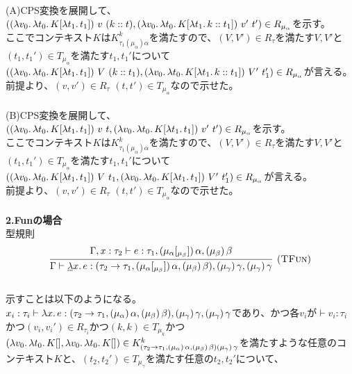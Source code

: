 \\
(A)CPS変換を展開して、\\
$(\LamP{v_0}{\Lam{t_0}{K[\Lam{t_1}{t_1}]}}\ v\ \ConsP{k}{t}, \LamP{v_0}{\Lam{t_0}{K[\Lam{t_1}{\Cons{k}{t_1}}]}}\ v'\ t')\in R_{\mu_{\alpha}}$を示す。\\
ここでコンテキスト$K$は$K^k_{\tau_1(\mu_{\alpha})\alpha}$を満たすので、$(V,V')\in R_{\tau}$を満たす$V,V'$と$(t_1, t_1')\in T_{\mu_{\alpha}}$を満たす$t_1, t_1'$について\\
$(\LamP{v_0}{\Lam{t_0}{K[\Lam{t_1}{t_1}]}}\ V\ \ConsP{k}{t_1}, \LamP{v_0}{\Lam{t_0}{K[\Lam{t_1}{\Cons{k}{t_1}}]}}\ V'\ t_1')\in R_{\mu_{\alpha}}$が言える。\\
前提より、$(v,v')\in R_{\tau}$ $(t, t') \in T_{\mu_{\alpha}}$なので示せた。\\
\\
(B)CPS変換を展開して、\\
$(\LamP{v_0}{\Lam{t_0}{K[\Lam{t_1}{t_1}]}}\ v\ t, \LamP{v_0}{\Lam{t_0}{K[\Lam{t_1}{t_1}]}}\ v'\ t')\in R_{\mu_{\alpha}}$を示す。\\
ここでコンテキスト$K$は$K^k_{\tau_1(\mu_{\alpha})\alpha}$を満たすので、$(V,V')\in R_{\tau}$を満たす$V,V'$と$(t_1, t_1')\in T_{\mu_{\alpha}}$を満たす$t_1, t_1'$について\\
$(\LamP{v_0}{\Lam{t_0}{K[\Lam{t_1}{t_1}]}}\ V\ t_1, \LamP{v_0}{\Lam{t_0}{K[\Lam{t_1}{t_1}]}}\ V'\ t_1')\in R_{\mu_{\alpha}}$が言える。\\
前提より、$(v,v')\in R_{\tau}$ $(t, t') \in T_{\mu_{\alpha}}$なので示せた。\\
\\
\textbf{2.Funの場合}\\
型規則
\[
\begin{array}{c}
\infer[\TFun]
      {\JudgeTrail{\Gamma}{\DLam{x}{e}}
                  {\ArrowTrailP{\tau_2}{\tau_1}
                               {\TrailsType{\alpha}{\beta}}
                               {\TrailType{\beta}}}
                  {\TrailType{\gamma}}
                  {\TrailType{\gamma}}}
      {\JudgeTrail{\Gamma,x:\tau_2}{e}{\tau_1}
                  {\TrailsType{\alpha}{\beta}}
                  {\TrailType{\beta}}}
\end{array}
\]
\\
示すことは以下のようになる。\\
$x_i:\tau_i \vdash \lambda{x}.\,{e}:(\tau_2\rightarrow{\tau_1},(\mu_{\alpha})\,\alpha,(\mu_{\beta})\,\beta), (\mu_{\gamma})\,\gamma, (\mu_{\gamma})\,\gamma$であり、かつ各$v_i$が$\vdash v_i:\tau_i$かつ$(v_i,v_i') \in R_{\tau_i}$かつ$(k,k)\in T_{\mu_k}$かつ$(\lambda{v_0}.\,{\lambda{t_0}.\,{K[]}}, \lambda{v_0}.\,{\lambda{t_0}.\,{K[]}})\in  K^k_{(\tau_2\rightarrow{\tau_1},(\mu_{\alpha})\,\alpha,(\mu_{\beta})\,\beta) (\mu_{\gamma})\,\gamma}$を満たすような任意のコンテキスト$K$と、$(t_2, t_2') \in T_{\mu_{\gamma}}$を満たす任意の$t_2, t_2'$について、\\
